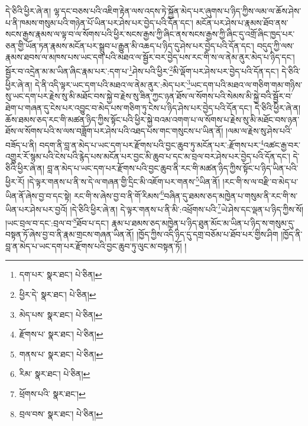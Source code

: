 དེ་ཅིའི་ཕྱིར་ཞེ་ན། ལྷ་དང་བཅས་པའི་འཇིག་རྟེན་ལས་འདས་ཏེ་སྐྱོན་མེད་པར་ཞུགས་པ་ཉིད་ཀྱིས་ལམ་ལ་ཆོས་ཤེས་པ་ནི་ཁམས་གསུམ་པའི་གཉེན་པོ་ཡིན་པར་ཤེས་པར་བྱེད་པའི་དོན་དང་། མངོན་པར་ཤེས་པ་རྣམས་ཐོབ་ནས་སངས་རྒྱས་རྣམས་ལ་ལྟ་བ་ལ་སོགས་པའི་ཕྱིར་སངས་རྒྱས་ཀྱི་ཞིང་ནས་སངས་རྒྱས་ཀྱི་ཞིང་དུ་འགྲོ་ཞིང་ཁྱད་པར་ཅན་གྱི་ཡོན་ཏན་རྣམས་མངོན་པར་སྒྲུབ་པ་རྒྱུན་མི་འཆད་པ་ཉིད་དུ་ཤེས་པར་བྱེད་པའི་དོན་དང་། བདུད་ཀྱི་ལས་རྣམས་ཐབས་ལ་མཁས་པས་ཡང་དག་པའི་མཐའ་ལ་སྦྱོར་བར་བྱེད་པས་རང་གི་ས་ལ་ནེམ་ནུར་མེད་པ་ཉིད་དང་། སྦྱོར་བ་འདྲེན་མ་མ་ཡིན་ཞིང་རྣམ་པར་:དག་པ་\footnote{དག་པར་  སྣར་ཐང་།  པེ་ཅིན། }ཤེས་པའི་ཕྱིར་\footnote{ཕྱིར་དེ་  སྣར་ཐང་།  པེ་ཅིན། }མི་ལྡོག་པར་ཤེས་པར་བྱེད་པའི་དོན་དང་། དེ་ཅིའི་ཕྱིར་ཞེ་ན། དེ་ནི་འདི་ལྟར་ཡང་དག་པའི་མཐའ་ལ་ནེམ་ནུར་:མེད་པར་\footnote{མེད་པས་  སྣར་ཐང་།  པེ་ཅིན། }ཡང་དག་པའི་མཐའ་ལ་གཅིག་གམ་གཉིས་སུ་ཡང་དག་པར་རྗེས་སུ་མི་མཐོང་བས་སྐྱེ་བ་རྗེས་སུ་ཟིན་ཀྱང་ཉན་ཐོས་ལ་སོགས་པའི་སེམས་མི་སྐྱེ་བའི་སྦྱོར་བ་ཐེག་པ་གཞན་དུ་ངེས་པར་འབྱུང་བ་མེད་པས་གཅིག་ཏུ་ངེས་པ་ཉིད་ཤེས་པར་བྱེད་པའི་དོན་དང་། དེ་ཅིའི་ཕྱིར་ཞེ་ན། ཆོས་ཐམས་ཅད་རང་གི་མཚན་ཉིད་ཀྱིས་སྟོང་པའི་ཕྱིར་སྐྱེ་བའམ་འགག་པ་ལ་སོགས་པ་རྗེས་སུ་མི་མཐོང་བས་ཉན་ཐོས་ལ་སོགས་པའི་ས་ལས་བཟློག་པར་ཤེས་པའི་འཐད་པས་གང་གསུངས་པ་ཡིན་ནོ། །ལམ་ལ་རྗེས་སུ་ཤེས་པའི་བཟོད་པ་ནི། བདག་ནི་བླ་ན་མེད་པ་ཡང་དག་པར་རྫོགས་པའི་བྱང་ཆུབ་ཏུ་མངོན་པར་:རྫོགས་པར་\footnote{རྫོགས་པ་  སྣར་ཐང་།  པེ་ཅིན། }འཚང་རྒྱ་བར་འགྱུར་རོ་སྙམ་པའི་ངེས་པའི་རྙེད་པས་མངོན་པར་བྱང་མི་ཆུབ་པ་དང་མ་བྲལ་བར་ཤེས་པར་བྱེད་པའི་དོན་དང་། དེ་ཅིའི་ཕྱིར་ཞེ་ན། བླ་ན་མེད་པ་ཡང་དག་པར་རྫོགས་པའི་བྱང་ཆུབ་ནི་རང་གི་མཚན་ཉིད་ཀྱིས་སྟོང་པ་ཉིད་ཡིན་པའི་ཕྱིར་རོ། །དེ་ལྟར་གནས་པ་ནི་ས་དེ་ལ་གཞན་གྱི་དྲིང་མི་འཇོག་པར་གནས་\footnote{གནས་པ་  སྣར་ཐང་།  པེ་ཅིན། }ཡིན་ནོ། །རང་གི་ས་ལ་བརྫི་བ་མེད་པ་ཡིན་ནོ་ཞེས་བྱ་བ་དང་སྟེ། རང་གི་ས་ཞེས་བྱ་བ་ནི་གོ་རིམས་\footnote{རིམ་  སྣར་ཐང་།  པེ་ཅིན། }བཞིན་དུ་ཐམས་ཅད་མཁྱེན་པ་གསུམ་ནི་རང་གི་ས་ཡིན་པར་ཤེས་པར་བྱའོ། །དེ་ཅིའི་ཕྱིར་ཞེ་ན། དེ་ལྟར་གནས་པ་ནི་མི་:འཕྲོགས་པའི་\footnote{ཕྲོགས་པའི་  སྣར་ཐང་། }ཡེ་ཤེས་དང་ལྡན་པ་ཉིད་ཀྱིས་སོ། །ཡང་བྲལ་བ་དང་:བྲལ་བ་\footnote{བྲལ་བས་  སྣར་ཐང་།  པེ་ཅིན། }ཐོབ་པ་དང་། རྣམ་པ་ཐམས་ཅད་མཁྱེན་པ་ཉིད་ཐུན་མོང་མ་ཡིན་པ་ཉིད་ས་གསུམ་དུ་བསྟན་ཏོ་ཞེས་བྱ་བ་ནི་རྣམ་གྲངས་གཞན་ཡིན་ནོ། །ཁྱོད་ཀྱིས་འདི་ཉིད་དུ་དགྲ་བཅོམ་པ་ཐོབ་པར་གྱིས་ཤིག །ཁྱོད་ནི་བླ་ན་མེད་པ་ཡང་དག་པར་རྫོགས་པའི་བྱང་ཆུབ་ཏུ་ལུང་མ་བསྟན་ཏོ། །
